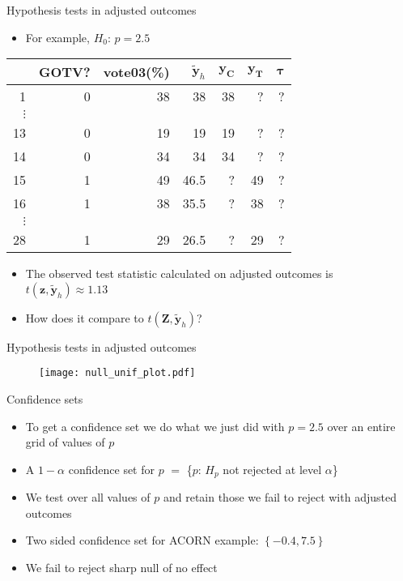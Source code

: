 \documentclass[table, xcolor = {dvipsnames}, 9pt]{beamer}
\theoremstyle{plain}
\begin{document}
\begin{frame}{Hypothesis tests in adjusted outcomes}
\begin{itemize}
\item For example, $H_0$: $p = 2.5$  
\end{itemize}
\begin{center}
  \begin{tabular}{r|rr|rrrr}
  \hline
 & GOTV? & vote03(\%)& $\bm{\tilde{y}}_h$ & $\bm{y_C}$ & $\bm{y_T}$ & $\bm{\tau}$\\
  \hline
1 & 0 & 38 & 38 & 38 & ? & ?\\
$\vdots$& & & & & & \\
13 & 0 & 19 & 19 & 19& ? & ?\\
14 & 0 & 34 & 34 & 34& ? & ?\\
15 & 1 & 49 & 46.5 & ?& 49 & ?\\
16 & 1 & 38 & 35.5 & ?& 38 & ?\\
$\vdots$& & & & & & \\
28 & 1 & 29 & 26.5 & ?& 29 & ? \\
   \hline
\end{tabular}
\end{center}
\begin{itemize}
\item The observed test statistic calculated on adjusted outcomes is $t(\bm{z}, \bm{\tilde{y}}_h) \approx 1.13$
\item How does it compare to $t\left(\bm{Z}, \bm{\tilde{y}}_h\right)$?
\end{itemize}
\end{frame}
\begin{frame}{Hypothesis tests in adjusted outcomes}
\begin{figure}[H]
\texttt{[image: null\_unif\_plot.pdf]}
\end{figure}
\end{frame}
\begin{frame}{Confidence sets}
\vfill
\begin{itemize} \vfill
\item To get a confidence set we do what we just did with $p = 2.5$ over an entire grid of values of $p$ \vfill
\item A $1-\alpha$ confidence set for $p$ $= $ \{$p$: $H_{p}$ not rejected at level $\alpha$\} \vfill
\item We test over all values of $p$ and retain those we fail to reject with adjusted outcomes \vfill
\item Two sided confidence set for ACORN example: $\left\{-0.4, 7.5\right\}$ \vfill
\item We fail to reject sharp null of no effect \vfill
\end{itemize}
\end{frame}
\end{document}
